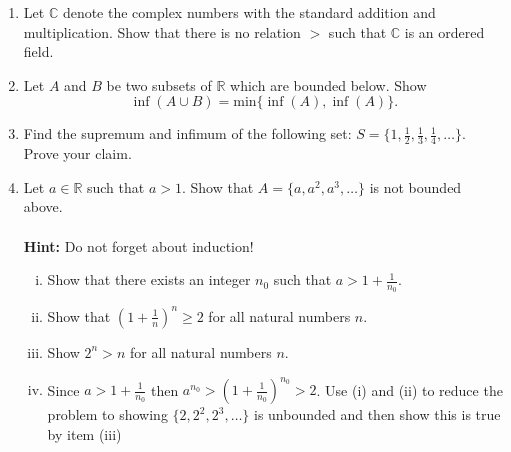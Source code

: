 \documentclass[12pt,letterpaper]{article}
\theoremstyle{plain}
\theoremstyle{definition}
\begin{document}
\begin{enumerate}[1.]
 \item Let $\mathbb{C}$ denote the complex numbers with the standard addition and multiplication. Show that there is no relation $>$ such that $\mathbb{C}$ is an ordered field. 
 \item Let $A$ and $B$ be two subsets of $\mathbb{R}$ which are bounded below. 
 Show \[\inf(A\cup B)=\text{min}\{\inf(A),\inf(A)\}.\]
 \item Find the supremum and infimum of the following set: $S=\{1,\frac{1}{2}, \frac{1}{3},\frac{1}{4},\ldots\}$. Prove your claim. 
 \item Let $a\in \mathbb{R}$ such that $a>1$. Show that $A=\{a, a^2, a^3,\ldots \}$ is not bounded above.\\
 \ \\
 {\bf Hint:} Do not forget about induction!
 \begin{enumerate}[(i)]
 \item Show that there exists an integer $n_0$ such that $a>1+\frac{1}{n_0}$. 
 \item Show that $\left(1+\frac{1}{n}\right)^n\geq 2$ for all natural numbers $n$.
 \item Show $2^n>n$ for all natural numbers $n$. 
 \item Since $a>1+\frac{1}{n_0}$ then $a^{n_0}>\left(1+\frac{1}{n_0}\right)^{n_0}>2$. Use (i) and (ii) to reduce the problem to showing $\{2, 2^2, 2^3,\ldots \}$ is unbounded and then show this is true by item (iii)
 \end{enumerate}
 \end{enumerate}
\end{document}

